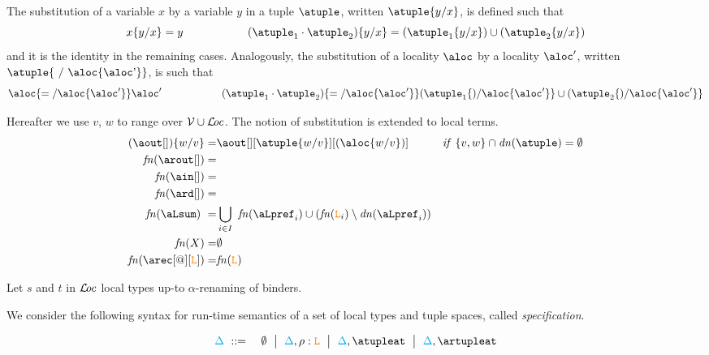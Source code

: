 The substitution of a variable $x$ by a variable $y$ in a tuple $\atuple$, written $\atuple \sust x y$, is 
defined such that 
$$  x \sust x y  =  y \hspace{2cm} (\atuple_1 \cdot \atuple_2)\sust x y  =  ( \atuple_1\sust x y) \cup ( \atuple_2\sust x y)$$
and it is the identity in the remaining cases. Analogously, 
the substitution of a locality $\aloc$ by a locality $\aloc'$, written $\atuple \sust \aloc {\aloc'}$, is such that
%
$$  \aloc \sust \aloc {\aloc'}  =  \aloc' \hspace{2cm} (\atuple_1 \cdot \atuple_2)\sust \aloc {\aloc'}  =  ( \atuple_1\sust \aloc {\aloc'}) \cup ( \atuple_2\sust \aloc {\aloc'})$$
%
 
Hereafter we use $v$, $w$ to range over $\mathcal{V}\cup\mathcal{L}\!\mathit{oc}$. The notion of substitution is extended to local terms.
\begin{align*}
  (\aout[]) \sust v w  = &  \aout[][\atuple\sust v w][(\aloc\sust v w)] &  {\it if}\  \{v,w\}\cap \dn\atuple = \emptyset
  \\ 
  \fn {\arout[]} = & 
  \\
  \fn {\ain[]}  = &
  \\
  \fn {\ard[]}  = &
  \\
  \fn {\aLsum}  = & \bigcup_{i\in I} \fn{\aLpref_i}\cup (\fn {\aL_i}\setminus \dn{\aLpref_i}) 
  \\
  \fn {X}  = & \emptyset 
  \\
  \fn {\arec[@][\aL]}  = & \fn {\aL} 
\end{align*}


Let $s$ and $t$ in $\mathcal{L}\!\mathit{oc}$  local types up-to $\alpha$-renaming of binders. 

%
%

We consider the following syntax for run-time semantics of a set of local types and tuple spaces, 
called {\em specification}.

\begin{eqnarray*}
  \envmv & \bnfdef & \emptyset \bnfmid
                  \envmv, \arole :  \aL \bnfmid
                  \envmv, \atupleat \bnfmid
                  \envmv, \artupleat                  
\end{eqnarray*}

